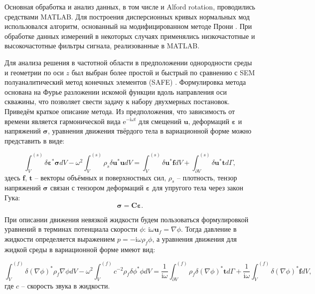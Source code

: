 \documentclass[a4paper,11pt]{article}
\newcommand{\ii}{\mathrm{i}}
\begin{document}
Основная обработка и анализ данных, в том числе и Alford rotation, проводились средствами MATLAB. Для построения дисперсионных кривых нормальных мод использовался алгоритм, основанный на модифицированном методе Прони \cite{Ekstrom1995}. При обработке данных измерений в некоторых случаях применялись низкочастотные и высокочастотные фильтры сигнала, реализованные в MATLAB. 

Для анализа решения в частотной области в предположении однородности среды и геометрии по оси $z$ был выбран более простой и быстрый по сравнению с SEM полуаналитический метод конечных элементов (SAFE) \cite{Bartoli2006}. Формулировка метода основана на Фурье разложении искомой функции вдоль направления оси скважины, что позволяет свести задачу к набору двухмерных постановок. Приведём краткое описание метода. Из предположения, что зависимость от времени является гармонической вида $\mathrm{e}^{-\ii\omega t}$ для смещений $\mathbf{u}$, деформаций $\boldsymbol{\varepsilon}$ и напряжений $\boldsymbol{\sigma}$, уравнения движения твёрдого тела в вариационной форме можно представить в виде:

\begin{equation}
\int_{V}^{(s)}\delta \boldsymbol{\varepsilon}^* \boldsymbol{\sigma} dV - \omega^2 \int_{V}^{(s)} \rho_s \delta \mathbf{u}^*\mathbf{u}dV = \int_{V}^{(s)}\delta \mathbf{u}^* \mathbf{f} dV + \int_{\partial V}^{(s)}\delta \mathbf{u}^* \mathbf{t} d\Gamma, \label{var_eq_solid}
\end{equation}
здесь $\mathbf{f}$, $\mathbf{t}$ -- векторы объёмных и поверхностных сил, $\rho_s$ -- плотность, тензор напряжений $\boldsymbol{\sigma}$ связан с тензором деформаций $\boldsymbol{\varepsilon}$ для упругого тела через закон Гука:
$$
\boldsymbol{\sigma} = \mathbf{C}\boldsymbol{\varepsilon}.
$$

При описании движения невязкой жидкости будем пользоваться формулировкой уравнений в терминах потенциала скорости $\phi$: $\ii \omega \mathbf{u}_f = \nabla \phi$. Тогда давление в жидкости определяется выражением $p = -\ii \omega \rho_f \phi$, а уравнения движения для жидкой среды в вариационной форме имеют вид: 

\begin{equation}
\int_{V}^{(f)} \delta (\nabla\phi)^* \rho_f  \nabla \phi dV - \omega^2 \int_{V}^{(f)}  c^{-2} \rho_f \delta \phi^*  \phi dV = \frac{1}{\ii\omega}\int_{\partial V}^{(f)} \rho_f \delta(\nabla \phi)^* \mathbf{t} d\Gamma + \frac{1}{\ii\omega} \int_{V}^{(f)} \delta(\nabla \phi)^* \mathbf{f} dV, \label{var_eq_fluid}
\end{equation}
где $c$ -- скорость звука в жидкости.
\end{document}
